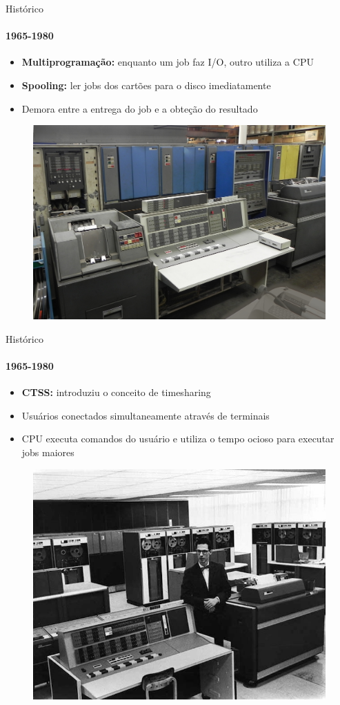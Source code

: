 \documentclass{beamer}
\begin{document}
\begin{frame}{Histórico}
	\framesubtitle{1965-1980}
	\begin{itemize}
		\item \textbf{Multiprogramação:} enquanto um job faz I/O, outro utiliza a CPU
		\item \textbf{Spooling:} ler jobs dos cartões para o disco imediatamente
		\item Demora entre a entrega do job e a obteção do resultado
	\end{itemize}
	\begin{figure}
		\includegraphics[width=0.5\paperwidth]{resources/ibm7094}
	\end{figure}
\end{frame}
\begin{frame}{Histórico}
	\framesubtitle{1965-1980}
	\begin{itemize}
		\item \textbf{CTSS:} introduziu o conceito de \alert{timesharing}
		\item Usuários conectados simultaneamente através de terminais
		\item CPU executa comandos do usuário e utiliza o tempo ocioso para executar jobs maiores
	\end{itemize}
	\begin{figure}
		\includegraphics[width=0.4\paperwidth]{resources/ctss}
	\end{figure}
\end{frame}
\end{document}
